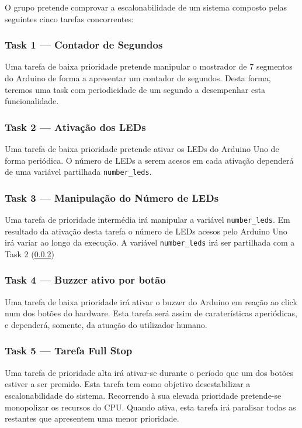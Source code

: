 \documentclass{article}
\begin{document}
O grupo pretende comprovar a escalonabilidade de um sistema composto pelas seguintes cinco tarefas concorrentes:

\subsubsection{Task 1 --- Contador de Segundos}

Uma tarefa de baixa prioridade pretende manipular o mostrador de 7 segmentos do Arduino de forma a apresentar um contador de segundos. Desta forma, teremos uma task com periodicidade de um segundo a desempenhar esta funcionalidade.

\subsubsection{Task 2 --- Ativação dos LEDs}
\label{task_2}
Uma tarefa de baixa prioridade pretende ativar os LEDs do Arduino Uno de forma periódica. O número de LEDs a serem acesos em cada ativação dependerá de uma variável partilhada \texttt{number\_leds}.

\subsubsection{Task 3 --- Manipulação do Número de LEDs}

Uma tarefa de prioridade intermédia irá manipular a variável \texttt{number\_leds}. Em resultado da ativação desta tarefa o número de LEDs acesos pelo Arduino Uno irá variar ao longo da execução. A variável \texttt{number\_leds} irá ser partilhada com a Task 2 (\ref{task_2})

\subsubsection{Task 4 --- Buzzer ativo por botão}

Uma tarefa de baixa prioridade irá ativar o buzzer do Arduino em reação ao click num dos botões do hardware. Esta tarefa será assim de caraterísticas aperiódicas, e dependerá, somente, da atuação do utilizador humano.

\subsubsection{Task 5 --- Tarefa Full Stop}

Uma tarefa de prioridade alta irá ativar-se durante o período que um dos botões estiver a ser premido. Esta tarefa tem como objetivo desestabilizar a escalonabilidade do sistema. Recorrendo à sua elevada prioridade pretende-se monopolizar os recursos do CPU. Quando ativa, esta tarefa irá paralisar todas as restantes que apresentem uma menor prioridade. 
\end{document}
